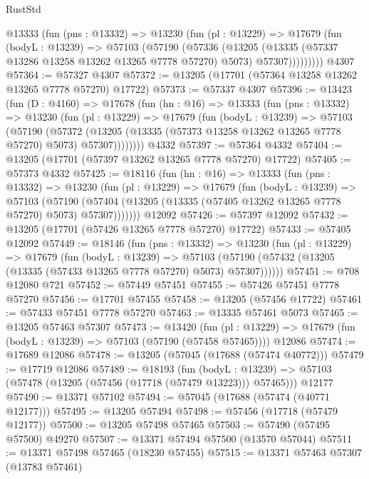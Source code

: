 \begin{lexlean}{RustStd}
\begin{coremodule}
        @13333
          (fun (pns : @13332) =>
          @13230
            (fun (pl : @13229) =>
            @17679
              (fun (bodyL : @13239) =>
              @57103
                (@57190
                  (@57336
                    (@13205
                      (@13335 (@57337 @13286 @13258 @13262 @13265 @7778 @57270) @5073)
                      @57307)))))))))
    @4307
@57364 := @57327 @4307
@57372 := @13205 (@17701 (@57364 @13258 @13262 @13265 @7778 @57270) @17722)
@57373 := @57337 @4307
@57396 := @13423
    (fun (D : @4160) =>
    @17678
      (fun (hn : @16) =>
      @13333
        (fun (pns : @13332) =>
        @13230
          (fun (pl : @13229) =>
          @17679
            (fun (bodyL : @13239) =>
            @57103
              (@57190
                (@57372
                  (@13205 (@13335 (@57373 @13258 @13262 @13265 @7778 @57270) @5073) @57307))))))))
    @4332
@57397 := @57364 @4332
@57404 := @13205 (@17701 (@57397 @13262 @13265 @7778 @57270) @17722)
@57405 := @57373 @4332
@57425 := @18116
    (fun (hn : @16) =>
    @13333
      (fun (pns : @13332) =>
      @13230
        (fun (pl : @13229) =>
        @17679
          (fun (bodyL : @13239) =>
          @57103
            (@57190 (@57404 (@13205 (@13335 (@57405 @13262 @13265 @7778 @57270) @5073) @57307)))))))
    @12092
@57426 := @57397 @12092
@57432 := @13205 (@17701 (@57426 @13265 @7778 @57270) @17722)
@57433 := @57405 @12092
@57449 := @18146
    (fun (pns : @13332) =>
    @13230
      (fun (pl : @13229) =>
      @17679
        (fun (bodyL : @13239) =>
        @57103 (@57190 (@57432 (@13205 (@13335 (@57433 @13265 @7778 @57270) @5073) @57307))))))
@57451 := @708 @12080 @721
@57452 := @57449 @57451
@57455 := @57426 @57451 @7778 @57270
@57456 := @17701 @57455
@57458 := @13205 (@57456 @17722)
@57461 := @57433 @57451 @7778 @57270
@57463 := @13335 @57461 @5073
@57465 := @13205 @57463 @57307
@57473 := @13420
    (fun (pl : @13229) => @17679 (fun (bodyL : @13239) => @57103 (@57190 (@57458 @57465))))
    @12086
@57474 := @17689 @12086
@57478 := @13205 (@57045 (@17688 (@57474 @40772)))
@57479 := @17719 @12086
@57489 := @18193
    (fun (bodyL : @13239) => @57103 (@57478 (@13205 (@57456 (@17718 (@57479 @13223))) @57465)))
    @12177
@57490 := @13371 @57102
@57494 := @57045 (@17688 (@57474 (@40771 @12177)))
@57495 := @13205 @57494
@57498 := @57456 (@17718 (@57479 @12177))
@57500 := @13205 @57498 @57465
@57503 := @57490 (@57495 @57500) @49270
@57507 := @13371 @57494 @57500 (@13570 @57044)
@57511 := @13371 @57498 @57465 (@18230 @57455)
@57515 := @13371 @57463 @57307 (@13783 @57461)

\end{coremodule}
\end{lexlean}
